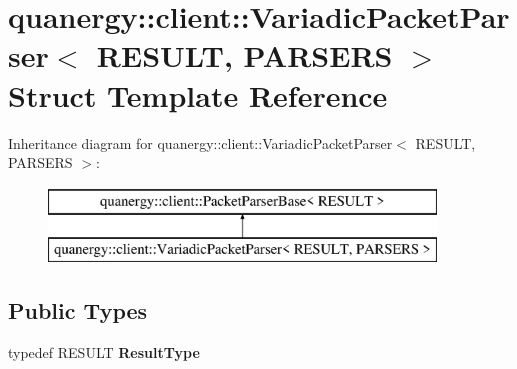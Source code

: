 \hypertarget{structquanergy_1_1client_1_1VariadicPacketParser}{\section{quanergy\-:\-:client\-:\-:Variadic\-Packet\-Parser$<$ R\-E\-S\-U\-L\-T, P\-A\-R\-S\-E\-R\-S $>$ Struct Template Reference}
\label{structquanergy_1_1client_1_1VariadicPacketParser}
}
Inheritance diagram for quanergy\-:\-:client\-:\-:Variadic\-Packet\-Parser$<$ R\-E\-S\-U\-L\-T, P\-A\-R\-S\-E\-R\-S $>$\-:\begin{figure}[H]
\begin{center}
\leavevmode
\includegraphics[height=2.000000cm]{structquanergy_1_1client_1_1VariadicPacketParser}
\end{center}
\end{figure}
\subsection*{Public Types}
\begin{DoxyCompactItemize}
\item 
\hypertarget{structquanergy_1_1client_1_1VariadicPacketParser_aad48760d6d29342cf8358371b2fea630}{typedef R\-E\-S\-U\-L\-T {\bfseries Result\-Type}}\label{structquanergy_1_1client_1_1VariadicPacketParser_aad48760d6d29342cf8358371b2fea630}

\end{DoxyCompactItemize}
